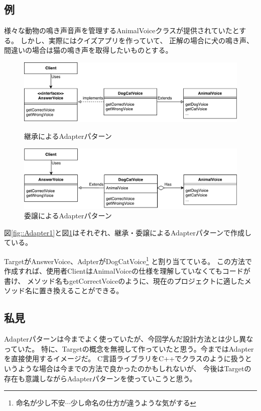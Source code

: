 \documentclass[11pt]{jsarticle}
\begin{document}
		\subsection{例}\label{sub::adapter1}
			様々な動物の鳴き声音声を管理するAnimalVoiceクラスが提供されていたとする。
			しかし、実際にはクイズアプリを作っていて、
			正解の場合に犬の鳴き声、間違いの場合は猫の鳴き声を取得したいものとする。
			
			\begin{figure}[htbp]
				\centering
				\includegraphics[width = 0.8\hsize]{AdapterPattern1.pdf}
				\caption{継承によるAdapterパターン}\label{fig::Adapter1}
				
				\includegraphics[width = 0.8\hsize]{AdapterPattern2.pdf}
				\caption{委譲によるAdapterパターン}\label{fig::Adapter2}
			\end{figure}
			
			図\ref{fig::Adapter1}と図\ref{fig::Adapter2}はそれぞれ、継承・委譲によるAdapterパターンで作成している。
			
			TargetがAnswerVoice、AdpterがDogCatVoice\footnote{命名が少し不安$\cdots$少し命名の仕方が違うような気がする}
			と割り当てている。
			この方法で作成すれば、使用者ClientはAnimalVoiceの仕様を理解していなくてもコードが書け、
			メソッド名もgetCorrectVoiceのように、現在のプロジェクトに適したメソッド名に置き換えることができる。
		
		\subsection{私見}
			Adapterパターンは今までよく使っていたが、今回学んだ設計方法とは少し異なっていた。
			特に、Targetの概念を無視して作っていたと思う。今まではAdapterを直接使用するイメージだ。
			C言語ライブラリをC++でクラスのように扱うというような場合は今までの方法で良かったのかもしれないが、
			今後はTargetの存在も意識しながらAdapterパターンを使っていこうと思う。
			
\end{document}
